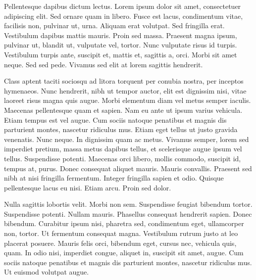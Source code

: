 \documentclass[MSc, ida]{histhesis}
\begin{document}
Pellentesque dapibus dictum lectus. Lorem ipsum dolor sit amet, consectetuer
adipiscing elit. Sed ornare quam in libero. Fusce est lacus, condimentum vitae,
facilisis non, pulvinar ut, urna. Aliquam erat volutpat. Sed fringilla erat.
Vestibulum dapibus mattis mauris. Proin sed massa. Praesent magna ipsum,
pulvinar ut, blandit ut, vulputate vel, tortor. Nunc vulputate risus id turpis.
Vestibulum turpis ante, suscipit et, mattis et, sagittis a, orci. Morbi sit
amet neque. Sed sed pede. Vivamus sed elit at lorem sagittis hendrerit.

Class aptent taciti sociosqu ad litora torquent per conubia nostra, per
inceptos hymenaeos. Nunc hendrerit, nibh ut tempor auctor, elit est dignissim
nisi, vitae laoreet risus magna quis augue. Morbi elementum diam vel metus
semper iaculis. Maecenas pellentesque quam et sapien. Nam eu ante ut ipsum
varius vehicula. Etiam tempus est vel augue. Cum sociis natoque penatibus et
magnis dis parturient montes, nascetur ridiculus mus. Etiam eget tellus ut
justo gravida venenatis. Nunc neque. In dignissim quam ac metus. Vivamus
semper, lorem sed imperdiet pretium, massa metus dapibus tellus, et scelerisque
augue ipsum vel tellus. Suspendisse potenti. Maecenas orci libero, mollis
commodo, suscipit id, tempus at, purus. Donec consequat aliquet mauris. Mauris
convallis. Praesent sed nibh at nisi fringilla fermentum. Integer fringilla
sapien et odio. Quisque pellentesque lacus eu nisi. Etiam arcu. Proin sed
dolor.

Nulla sagittis lobortis velit. Morbi non sem. Suspendisse feugiat bibendum
tortor. Suspendisse potenti. Nullam mauris. Phasellus consequat hendrerit
sapien. Donec bibendum. Curabitur ipsum nisi, pharetra sed, condimentum eget,
ullamcorper non, tortor. Ut fermentum consequat magna. Vestibulum rutrum justo
at leo placerat posuere. Mauris felis orci, bibendum eget, cursus nec, vehicula
quis, quam. In odio nisi, imperdiet congue, aliquet in, suscipit sit amet,
augue. Cum sociis natoque penatibus et magnis dis parturient montes, nascetur
ridiculus mus. Ut euismod volutpat augue.
\end{document}
